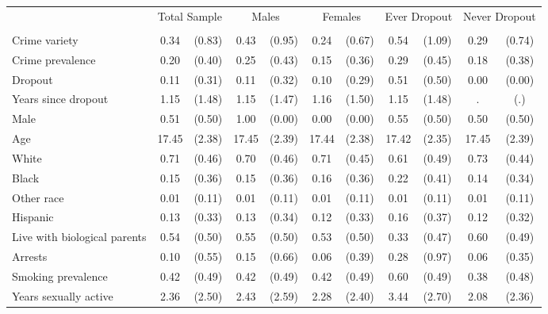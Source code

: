 {
\def\sym#1{\ifmmode^{#1}\else\(^{#1}\)\fi}
\begin{tabular}{l*{5}{cc}}
\toprule
                &\multicolumn{2}{c}{Total Sample}&\multicolumn{2}{c}{Males}&\multicolumn{2}{c}{Females}&\multicolumn{2}{c}{Ever Dropout}&\multicolumn{2}{c}{Never Dropout}\\
                &         &         &         &         &         &         &         &         &         &         \\
\midrule
Crime variety   &     0.34&   (0.83)&     0.43&   (0.95)&     0.24&   (0.67)&     0.54&   (1.09)&     0.29&   (0.74)\\
Crime prevalence&     0.20&   (0.40)&     0.25&   (0.43)&     0.15&   (0.36)&     0.29&   (0.45)&     0.18&   (0.38)\\
Dropout         &     0.11&   (0.31)&     0.11&   (0.32)&     0.10&   (0.29)&     0.51&   (0.50)&     0.00&   (0.00)\\
Years since dropout&     1.15&   (1.48)&     1.15&   (1.47)&     1.16&   (1.50)&     1.15&   (1.48)&        .&      (.)\\
Male            &     0.51&   (0.50)&     1.00&   (0.00)&     0.00&   (0.00)&     0.55&   (0.50)&     0.50&   (0.50)\\
Age             &    17.45&   (2.38)&    17.45&   (2.39)&    17.44&   (2.38)&    17.42&   (2.35)&    17.45&   (2.39)\\
White           &     0.71&   (0.46)&     0.70&   (0.46)&     0.71&   (0.45)&     0.61&   (0.49)&     0.73&   (0.44)\\
Black           &     0.15&   (0.36)&     0.15&   (0.36)&     0.16&   (0.36)&     0.22&   (0.41)&     0.14&   (0.34)\\
Other race      &     0.01&   (0.11)&     0.01&   (0.11)&     0.01&   (0.11)&     0.01&   (0.11)&     0.01&   (0.11)\\
Hispanic        &     0.13&   (0.33)&     0.13&   (0.34)&     0.12&   (0.33)&     0.16&   (0.37)&     0.12&   (0.32)\\
Live with biological parents&     0.54&   (0.50)&     0.55&   (0.50)&     0.53&   (0.50)&     0.33&   (0.47)&     0.60&   (0.49)\\
Arrests         &     0.10&   (0.55)&     0.15&   (0.66)&     0.06&   (0.39)&     0.28&   (0.97)&     0.06&   (0.35)\\
Smoking prevalence&     0.42&   (0.49)&     0.42&   (0.49)&     0.42&   (0.49)&     0.60&   (0.49)&     0.38&   (0.48)\\
Years sexually active&     2.36&   (2.50)&     2.43&   (2.59)&     2.28&   (2.40)&     3.44&   (2.70)&     2.08&   (2.36)\\

\end{tabular}}
